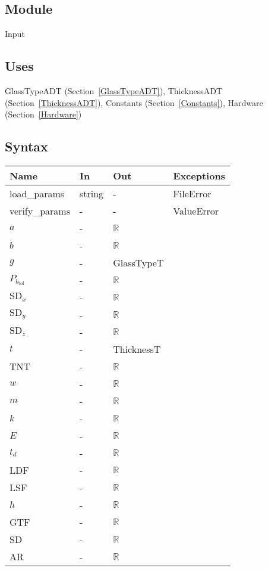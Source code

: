 \documentclass[12pt, titlepage]{article}
\begin{document}
\subsection{Module}

Input

\subsection{Uses}

GlassTypeADT (Section~\ref{GlassTypeADT}), ThicknessADT
(Section~\ref{ThicknessADT}), Constants (Section~\ref{Constants}), Hardware
(Section~\ref{Hardware})

\subsection{Syntax}

\begin{tabular}{p{3cm} p{1cm} p{3cm} >{\raggedright\arraybackslash}p{7cm}}
\toprule
\textbf{Name} & \textbf{In} & \textbf{Out} & \textbf{Exceptions} \\
\midrule
load\_params & string & - &  FileError \\
verify\_params & - & - & ValueError \\
$a$ & - & $\mathbb{R}$\\
$b$ & - & $\mathbb{R}$\\
$g$ & - & GlassTypeT\\
$P_{b_\text{tol}}$ & - & $\mathbb{R}$\\
$\text{SD}_x$ & - & $\mathbb{R}$\\
$\text{SD}_y$ & - & $\mathbb{R}$\\
$\text{SD}_z$ & - & $\mathbb{R}$\\
$t$ & - & ThicknessT\\
TNT & - & $\mathbb{R}$\\
$w$ & - & $\mathbb{R}$\\
$m$ & - & $\mathbb{R}$\\
$k$ & - & $\mathbb{R}$\\
$E$ & - & $\mathbb{R}$\\
$t_d$ & - & $\mathbb{R}$\\
LDF & - & $\mathbb{R}$\\
LSF & - & $\mathbb{R}$\\
$h$ & - & $\mathbb{R}$\\
GTF & - & $\mathbb{R}$\\
SD & - & $\mathbb{R}$\\
AR & - & $\mathbb{R}$\\
\bottomrule
\end{tabular}
\end{document}
